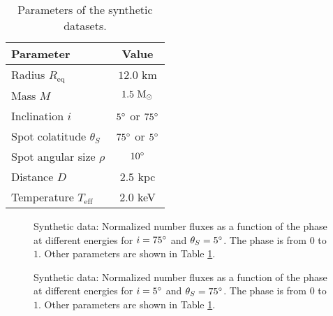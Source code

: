 \documentclass{wihuri}
\def\msun{{\rm M_{\odot}}}
\def\thetas{\theta_{S}}
\def\req{R_{\mathrm{eq}}}
\begin{document}
\begin{center}
\begin{table}
  \caption{Parameters of the synthetic datasets.}
\label{table:params}
\begin{center}
  \begin{tabular}[c]{ l  c } %
    \hline
    \hline
     Parameter & Value\\ \hline
      Radius $\req$ & $12.0$ km  \\ %
      Mass $M$ & $1.5 ~\msun$  \\ %
      Inclination $i$ & $5 \degree$ or $75 \degree$ \\ %
      Spot colatitude $\thetas$ & $75 \degree$ or $5 \degree$ \\ %
      Spot angular size $\rho$ & $10 \degree$  \\ %
      Distance $D$ & $2.5$ kpc \\ %
      Temperature $T_{\mathrm{eff}}$ & $2.0$ keV \\

    \hline
  \end{tabular}
  \end{center} 

  \end{table}
\end{center} 



%



\begin{figure}
\centerline{}
\caption{Synthetic data: Normalized number fluxes as a function of the phase at different energies for $i = 75 \degree$ and $\thetas = 5 \degree$. The phase is from $0$ to $1$. Other parameters are shown in Table \ref{table:params}.
\label{fig:syntpol2}}
\end{figure}


\begin{figure}
\centerline{}
\caption{Synthetic data: Normalized number fluxes as a function of the phase at different energies for $i = 5 \degree$ and $\thetas = 75 \degree$. The phase is from $0$ to $1$. Other parameters are shown in Table \ref{table:params}.
\label{fig:synteq2}}
\end{figure}
\end{document}
